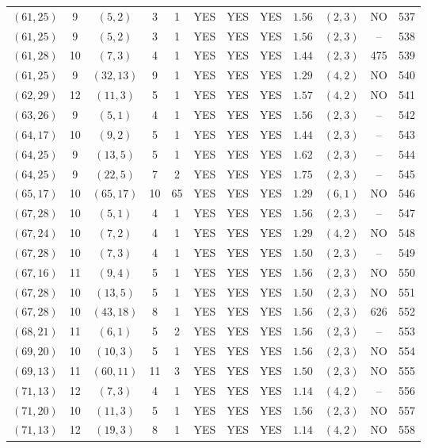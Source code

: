 \begin{longtable}{|c|c|c|c|c|c|c|c|c|c|c|c|}
$(61,25)$ & 9 & $(5,2)$ & 3 & 1 & YES & YES & YES & $1.56$ & $(2,3)$ & NO & 537\\
$(61,25)$ & 9 & $(5,2)$ & 3 & 1 & YES & YES & YES & $1.56$ & $(2,3)$ & -- & 538\\
$(61,28)$ & 10 & $(7,3)$ & 4 & 1 & YES & YES & YES & $1.44$ & $(2,3)$ & 475 & 539\\
$(61,25)$ & 9 & $(32,13)$ & 9 & 1 & YES & YES & YES & $1.29$ & $(4,2)$ & NO & 540\\
$(62,29)$ & 12 & $(11,3)$ & 5 & 1 & YES & YES & YES & $1.57$ & $(4,2)$ & NO & 541\\
$(63,26)$ & 9 & $(5,1)$ & 4 & 1 & YES & YES & YES & $1.56$ & $(2,3)$ & -- & 542\\
$(64,17)$ & 10 & $(9,2)$ & 5 & 1 & YES & YES & YES & $1.44$ & $(2,3)$ & -- & 543\\
$(64,25)$ & 9 & $(13,5)$ & 5 & 1 & YES & YES & YES & $1.62$ & $(2,3)$ & -- & 544\\
$(64,25)$ & 9 & $(22,5)$ & 7 & 2 & YES & YES & YES & $1.75$ & $(2,3)$ & -- & 545\\
$(65,17)$ & 10 & $(65,17)$ & 10 & 65 & YES & YES & YES & $1.29$ & $(6,1)$ & NO & 546\\
$(67,28)$ & 10 & $(5,1)$ & 4 & 1 & YES & YES & YES & $1.56$ & $(2,3)$ & -- & 547\\
$(67,24)$ & 10 & $(7,2)$ & 4 & 1 & YES & YES & YES & $1.29$ & $(4,2)$ & NO & 548\\
$(67,28)$ & 10 & $(7,3)$ & 4 & 1 & YES & YES & YES & $1.50$ & $(2,3)$ & -- & 549\\
$(67,16)$ & 11 & $(9,4)$ & 5 & 1 & YES & YES & YES & $1.56$ & $(2,3)$ & NO & 550\\
$(67,28)$ & 10 & $(13,5)$ & 5 & 1 & YES & YES & YES & $1.50$ & $(2,3)$ & NO & 551\\
$(67,28)$ & 10 & $(43,18)$ & 8 & 1 & YES & YES & YES & $1.56$ & $(2,3)$ & 626 & 552\\
$(68,21)$ & 11 & $(6,1)$ & 5 & 2 & YES & YES & YES & $1.56$ & $(2,3)$ & -- & 553\\
$(69,20)$ & 10 & $(10,3)$ & 5 & 1 & YES & YES & YES & $1.56$ & $(2,3)$ & NO & 554\\
$(69,13)$ & 11 & $(60,11)$ & 11 & 3 & YES & YES & YES & $1.50$ & $(2,3)$ & NO & 555\\
$(71,13)$ & 12 & $(7,3)$ & 4 & 1 & YES & YES & YES & $1.14$ & $(4,2)$ & -- & 556\\
$(71,20)$ & 10 & $(11,3)$ & 5 & 1 & YES & YES & YES & $1.56$ & $(2,3)$ & NO & 557\\
$(71,13)$ & 12 & $(19,3)$ & 8 & 1 & YES & YES & YES & $1.14$ & $(4,2)$ & NO & 558\\

\end{longtable}
